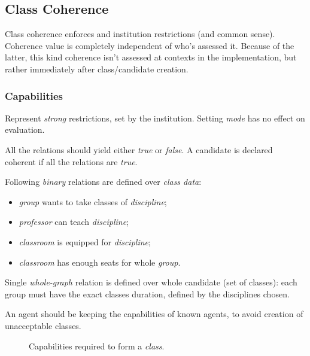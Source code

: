 \documentclass[../ThesisDoc]{subfiles}
\begin{document}
\providecommand{\rootdir}{..}

\subsection{Class Coherence}

Class coherence enforces and institution restrictions (and common sense).
Coherence value is completely independent of who's assessed it.
Because of the latter, this kind coherence isn't assessed at contexts
in the implementation, but rather immediately after class/candidate creation.

\subsubsection{Capabilities}

Represent \emph{strong} restrictions, set by the institution.
Setting \emph{mode} has no effect on evaluation.

All the relations should yield either \emph{true} or \emph{false}.
A candidate is declared coherent if all the relations are \emph{true}.

Following \emph{binary} relations are defined over \emph{class data}:
\begin{itemize}
  \item \emph{group} wants to take classes of \emph{discipline};
  \item \emph{professor} can teach \emph{discipline};
  \item \emph{classroom} is equipped for \emph{discipline};
  \item \emph{classroom} has enough seats for whole \emph{group}.
\end{itemize}

Single \emph{whole-graph} relation is defined over whole candidate (set of classes):
each group must have the exact classes duration, defined by the disciplines chosen.

An agent should be keeping the capabilities of known agents, to avoid creation
of unacceptable classes.

\begin{figure}[h]
  \centering
  
  \caption{Capabilities required to form a \emph{class}.}
  \label{fig:capabilities}
\end{figure}


\end{document}
